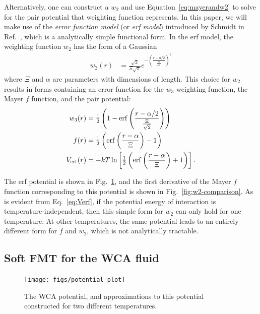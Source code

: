 \documentclass[letterpaper,twocolumn,amsmath,amssymb,prb]{revtex4-1}
\begin{document}
Alternatively, one can 
construct a $w_2$ and use Equation~\ref{eq:mayerandw2} to solve for the pair potential that weighting
function represents.
In this paper, we will make use of the \emph{error function model} (or
\emph{erf model}) introduced by Schmidt in 
Ref.~, which is a analytically simple
functional form.  In the erf model, the weighting function $w_2$ has the form of a Gaussian %
\begin{align}
  w_2(r) &= \frac{\sqrt{2}}{\Xi \sqrt{\pi}} e^{-\left( \frac{r-\alpha/2}{\frac{\Xi}{\sqrt{2}}} \right)^2}
  \label{eq:gaussianw2}
\end{align}
where $\Xi$ and $\alpha$ are parameters with dimensions of length.
This choice for $w_2$ results in forms containing an error function
for the $w_3$ weighting function, the Mayer $f$ function, and the pair
potential:
\begin{align}
  w_3(r) &= \tfrac12 \left( 1 - \mathrm{erf}\left(\frac{r-\alpha/2}{\frac{\Xi}{\sqrt{2}}}\right) \right) \\
  f(r) &= \tfrac12 \left( \mathrm{erf}\left( \frac{r - \alpha}{\Xi} \right) - 1 \right)
  \label{eq:mayer-approx} \\
  V_{\mathrm{erf}}(r) &= -kT\ln\left[\tfrac12 \left( \mathrm{erf}\left( \frac{r -
    \alpha}{\Xi} \right) + 1 \right) \right].\label{eq:Verf}
\end{align}

The erf potential is shown in Fig.~\ref{fig:potential-plot}, and the
first derivative of the Mayer $f$ function corresponding to this
potential is shown in Fig.~\ref{fig:w2-comparison}.  As is evident
from Eq.~\ref{eq:Verf}, if the potential energy of interaction is
temperature-independent, then this simple form for $w_2$ can only hold
for one temperature.  At other temperatures, the same potential leads
to an entirely different form for $f$ and $w_2$, which is not
analytically tractable.


\subsection{Soft FMT for the WCA fluid}

\begin{figure}
\begin{center}
\texttt{[image: figs/potential-plot]}
\end{center}
\caption{The WCA potential, and approximations to this potential
  constructed for two different temperatures.}
\label{fig:potential-plot}
\end{figure}
\end{document}
